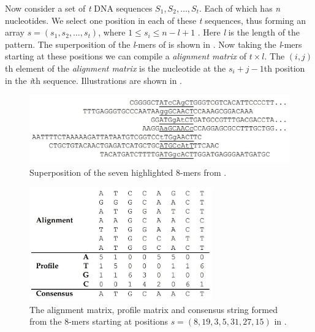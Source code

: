 Now consider a set of \textit{t} DNA sequences $ S_{1}, S_{2},\ldots,
S_{t} $. Each of which has \textit{n} nucleotides. We select one
position in each of these \textit{t} sequences, thus forming an array
$ s = (s_{1}, s_{2},\ldots,s_{t}) $, where $ 1 \leq s_{i} \leq n - l + 1$
.
Here \textit{l} is the length of the pattern. The superposition
of the \textit{l}-mers of  is shown in .
Now taking the \textit{l}-mers starting at these positions
we can compile a \textit{alignment matrix}
of $ t × l $. The $ (i, j) $th element of the \textit{alignment matrix}
is the nucleotide at the $ s_{i} + j − 1 $th position in the
\textit{i}th sequence. Illustrations are shown in .


\begin{figure}%
	\centering
	\includegraphics[width=1.0\textwidth]{figures/superpose}
	\caption{Superposition of the seven highlighted 8-mers from .}
	\label{fig:superpose}
\end{figure}
\begin{figure}%
	\centering
	\includegraphics[width=0.7\textwidth]{figures/consensus}
	\caption{The alignment matrix, profile matrix and consensus
		string formed from the 8-mers starting at positions
		$ s = (8, 19, 3, 5, 31, 27, 15) $ in .}
	\label{fig:consensus}
\end{figure}



